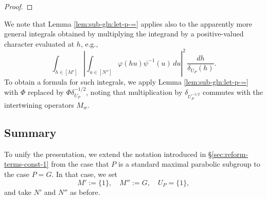 \documentclass[reqno]{amsart}
\DeclareMathOperator{\Eis}{Eis}
\theoremstyle{plain} \newtheorem{theorem} {Theorem}
\theoremstyle{definition} \newtheorem{definition} [theorem] {Definition}
\theoremstyle{itplain} %
\numberwithin{equation}{section}
\numberwithin{theorem}{section}
\begin{document}
\begin{proof}
\end{proof}

We note that Lemma \ref{lem:sub-gln:let-p-=} applies also to the apparently more general integrals obtained by multiplying the integrand by a positive-valued character evaluated at $h$, e.g.,
\begin{equation*}
  \int _{h \in [M']}
  \left\lvert \int _{u \in [N'']} \varphi(h u) \psi^{-1}(u) \,d u  \right\rvert^2
  \, \frac{d h}{\delta_{U_P}(h)}.
\end{equation*}
To obtain a formula for such integrals, we apply  Lemma \ref{lem:sub-gln:let-p-=} with $\Phi$ replaced by $\Phi \delta_{U_P}^{-1/2}$, noting that multiplication by $\delta_{U_P^{-1/2}}$ commutes with the intertwining operators $M_w$.


\subsection{Summary}\label{sec:summary-unification}
To unify the presentation, we extend the notation introduced in \S\ref{sec:reform-terms-const-1} from the case that $P$ is a standard maximal parabolic subgroup to the case $P = G$.  In that case, we set
\begin{equation*}
  M' := \{1\}, \quad M'' := G, \quad
  {U_P} = \{1\},
\end{equation*}
and take $N'$ and $N''$ as before.
\end{document}
